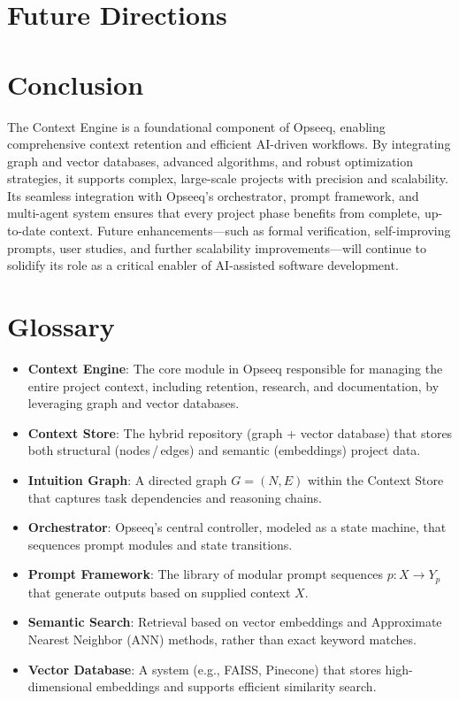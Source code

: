 \documentclass[11pt]{article}
\begin{document}
\section{Future Directions}
\label{sec:future}

\section{Conclusion}
\label{sec:conclusion}

The Context Engine is a foundational component of Opseeq, enabling comprehensive context retention and efficient AI-driven workflows. By integrating graph and vector databases, advanced algorithms, and robust optimization strategies, it supports complex, large-scale projects with precision and scalability. Its seamless integration with Opseeq’s orchestrator, prompt framework, and multi-agent system ensures that every project phase benefits from complete, up-to-date context. Future enhancements—such as formal verification, self-improving prompts, user studies, and further scalability improvements—will continue to solidify its role as a critical enabler of AI-assisted software development.

\appendix

\section{Glossary}
\label{app:glossary}

\begin{itemize}
  \item \textbf{Context Engine}: The core module in Opseeq responsible for managing the entire project context, including retention, research, and documentation, by leveraging graph and vector databases.
  \item \textbf{Context Store}: The hybrid repository (graph + vector database) that stores both structural (nodes\,/\,edges) and semantic (embeddings) project data.
  \item \textbf{Intuition Graph}: A directed graph \(G=(N,E)\) within the Context Store that captures task dependencies and reasoning chains.
  \item \textbf{Orchestrator}: Opseeq’s central controller, modeled as a state machine, that sequences prompt modules and state transitions.
  \item \textbf{Prompt Framework}: The library of modular prompt sequences \(p\colon X \to Y_p\) that generate outputs based on supplied context \(X\).
  \item \textbf{Semantic Search}: Retrieval based on vector embeddings and Approximate Nearest Neighbor (ANN) methods, rather than exact keyword matches.
  \item \textbf{Vector Database}: A system (e.g., FAISS, Pinecone) that stores high-dimensional embeddings and supports efficient similarity search.
\end{itemize}
\end{document}
